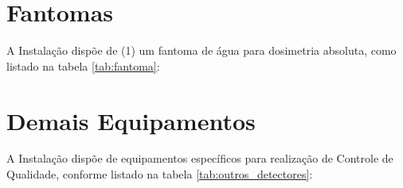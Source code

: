 \begin{table}[!h]
    \centering
    \caption{Outros instrumentos de medição.}
    \label{tab:instrumentos_medicao}
\end{table}

\pagebreak
\section{Fantomas}
\label{sec:fantomas}
A Instalação dispõe de (1) um fantoma de água para dosimetria absoluta, como listado na tabela \ref{tab:fantoma}:

\begin{table}[!h]
    \centering
    \caption{Fantomas.}
    \label{tab:fantoma}
\end{table}
    
\section{Demais Equipamentos}
\label{sec:outros_eqp}
A Instalação dispõe de equipamentos específicos para realização de Controle de Qualidade, conforme listado na tabela \ref{tab:outros_detectores}:

